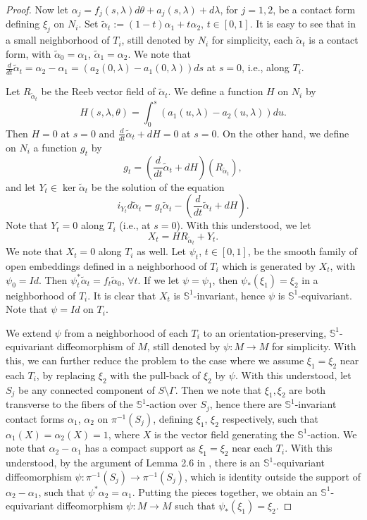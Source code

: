 \documentclass[11pt]{amsart}
\theoremstyle{plain}
\numberwithin{theorem}{section}
\theoremstyle{definition}
\newcommand{\s}{{\mathbb S}}
\begin{document}
\begin{proof}
Now let $\alpha_j=f_j(s,\lambda)d\theta+a_j(s,\lambda)+d\lambda$, for $j=1,2$, be a contact form
defining $\xi_j$ on $N_i$. Set $\tilde{\alpha}_t:=(1-t)\alpha_1+t\alpha_2$, $t\in [0,1]$. It is easy to
see that in a small neighborhood of $T_i$, still denoted by $N_i$ for simplicity, each 
$\tilde{\alpha}_t$ is a contact form, with $\tilde{\alpha}_0=\alpha_1$, $\tilde{\alpha}_1=\alpha_2$. 
We note that $\frac{d}{dt}\tilde{\alpha}_t=\alpha_2-\alpha_1=(a_2(0,\lambda)-a_1(0,\lambda))ds$
at $s=0$, i.e., along $T_i$. 

Let $R_{\tilde{\alpha}_t}$ be the Reeb vector field of $\tilde{\alpha}_t$. We define a function $H$
on $N_i$ by
$$
H(s,\lambda,\theta)=\int_{0}^s (a_1(u,\lambda)-a_2(u,\lambda))du.
$$
Then $H=0$ at $s=0$ and $\frac{d}{dt}\tilde{\alpha}_t+dH=0$ at $s=0$. On the other hand, we define
on $N_i$ a function $g_t$ by
$$
g_t=(\frac{d}{dt}\tilde{\alpha}_t+dH)(R_{\tilde{\alpha}_t}), 
$$
and let $Y_t\in \ker\tilde{\alpha}_t$ be the solution of the equation
$$
i_{Y_t} d\tilde{\alpha}_t= g_t\tilde{\alpha}_t - (\frac{d}{dt}\tilde{\alpha}_t+dH). 
$$
Note that $Y_t=0$ along $T_i$ (i.e., at $s=0$). With this understood, we let 
$$X_t=HR_{\tilde{\alpha}_t}+Y_t.$$
We note that $X_t=0$ along $T_i$ as well. Let $\psi_t$, 
$t\in [0,1]$, be the smooth family of open embeddings defined in a neighborhood of $T_i$
which is generated by $X_t$, with $\psi_0=Id$. Then $\psi^\ast_t \tilde{\alpha}_t=f_t\tilde{\alpha}_0$,
$\forall t$. If we let $\psi=\psi_1$, then $\psi_\ast (\xi_1)=\xi_2$ in a neighborhood of $T_i$.
It is clear that $X_t$ is $\s^1$-invariant, hence $\psi$ is $\s^1$-equivariant. Note that
$\psi=Id$ on $T_i$.

We extend $\psi$ from a neighborhood of each $T_i$ to an orientation-preserving, $\s^1$-equivariant diffeomorphism of $M$, still denoted by $\psi: M\rightarrow M$ for simplicity. With this, we can further reduce the problem to the case where we assume $\xi_1=\xi_2$ near each $T_i$, by replacing
$\xi_2$ with the pull-back of $\xi_2$ by $\psi$. With this understood, let $S_j$ be any
connected component of $S\setminus \Gamma$. Then we note that $\xi_1,\xi_2$ are
both transverse to the fibers of the $\s^1$-action over $S_j$, hence there are 
$\s^1$-invariant contact forms $\alpha_1$, $\alpha_2$ on $\pi^{-1}(S_j)$, defining $\xi_1$,
$\xi_2$ respectively, such that $\alpha_1(X)=\alpha_2(X)=1$, where $X$ is the vector field generating the $\s^1$-action. We note that $\alpha_2-\alpha_1$ has a compact support as $\xi_1=\xi_2$ near
each $T_i$. With this understood, by the argument of Lemma 2.6 in \cite{C1}, there is an $\s^1$-equivariant diffeomorphism $\psi: \pi^{-1}(S_j)\rightarrow \pi^{-1}(S_j)$, which is identity outside the
support of $\alpha_2-\alpha_1$, such that $\psi^\ast \alpha_2=\alpha_1$. Putting the pieces together,
we obtain an $\s^1$-equivariant diffeomorphism $\psi: M\rightarrow M$ 
such that $\psi_\ast(\xi_1)=\xi_2$. 

\end{proof}
\end{document}
